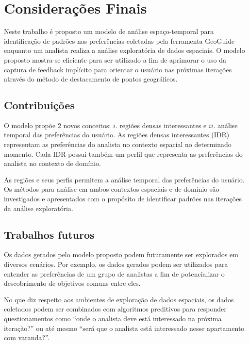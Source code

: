 \chapter{Considerações Finais}
\label{chap:conclusao}

Neste trabalho é proposto um modelo de análise espaço-temporal para identificação de padrões nas preferências coletadas pela ferramenta GeoGuide enquanto um analista realiza a análise exploratória de dados espaciais. O modelo proposto mostra-se eficiente para ser utilizado a fim de aprimorar o uso da captura de feedback implícito para orientar o usuário nas próximas iterações através do método de destacamento de pontos geográficos.

\section{Contribuições}

O modelo propõe 2 novos conceitos: $i$. regiões densas interessantes e $ii$. análise temporal das preferências do usuário. As regiões densas interessantes (IDR) representam as preferências do analista no contexto espacial no determinado momento. Cada IDR possui também um perfil que representa as preferências do analista no contexto de domínio.

As regiões e seus perfis permitem a análise temporal das preferências do usuário. Os métodos para análise em ambos contextos espaciais e de domínio são investigados e apresentados com o propósito de identificar padrões nas iterações da análise exploratória.

\section{Trabalhos futuros}

Os dados gerados pelo modelo proposto podem futuramente ser explorados em diversos cenários. Por exemplo, os dados gerados podem ser utilizados para entender as preferências de um grupo de analistas a fim de potencializar o descobrimento de objetivos comuns entre eles.

No que diz respeito aos ambientes de exploração de dados espaciais, os dados coletados podem ser combinados com algoritmos preditivos para responder questionamentos como ``onde o analista deve está interessado na próxima iteração?'' ou até mesmo ``será que o analista está interessado nesse apartamento com varanda?''.  